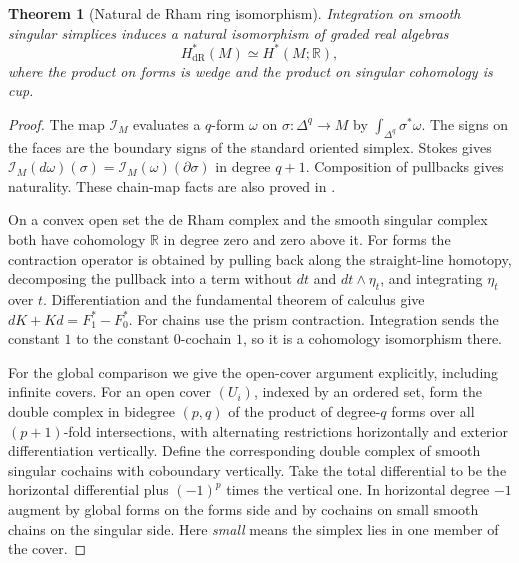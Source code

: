 \documentclass[11pt,oneside,openany]{book}
\theoremstyle{plain}
\newtheorem{theorem}{Theorem}[chapter]
\theoremstyle{definition}
\theoremstyle{remark}
\begin{document}
\begin{theorem}[Natural de Rham ring isomorphism]
\label{thm:p202-de-rham}
Integration on smooth singular simplices induces a natural
isomorphism of graded real algebras
\[
 H_{\mathrm{dR}}^*(M)\simeq H^*(M;\mathbb R),
\]
where the product on forms is wedge and the product on
singular cohomology is cup.
\end{theorem}
\begin{proof}
The map \(\mathcal I_M\) evaluates a \(q\)-form \(\omega\)
on \(\sigma:\Delta^q\to M\) by \(\int_{\Delta^q}\sigma^*\omega\).
The signs on the faces are the boundary signs of the
standard oriented simplex. Stokes gives
\(\mathcal I_M(d\omega)(\sigma)=
\mathcal I_M(\omega)(\partial\sigma)\) in degree \(q+1\).
Composition of pullbacks gives naturality. These
chain-map facts are also proved in \cite[Chapter 12]{P104}.

On a convex open set the de Rham complex and the
smooth singular complex both have cohomology \(\mathbb R\)
in degree zero and zero above it. For forms the contraction
operator is obtained by pulling back along the straight-line
homotopy, decomposing the pullback into a term without
\(dt\) and \(dt\wedge\eta_t\), and integrating \(\eta_t\)
over \(t\). Differentiation and the fundamental theorem
of calculus give \(dK+Kd=F_1^*-F_0^*\).
For chains use the prism contraction. Integration sends
the constant \(1\) to the constant \(0\)-cochain \(1\),
so it is a cohomology isomorphism there.

For the global comparison we give the open-cover argument
explicitly, including infinite covers. For an open cover
\((U_i)\), indexed by an ordered set, form the double
complex in bidegree \((p,q)\) of the product of degree-\(q\)
forms over all \((p+1)\)-fold intersections, with alternating
restrictions horizontally and exterior differentiation
vertically. Define the corresponding double complex of
smooth singular cochains with coboundary vertically.
Take the total differential to be the horizontal
differential plus \((-1)^p\) times the vertical one. In
horizontal degree \(-1\) augment by global forms on the
forms side and by cochains on small smooth chains on the
singular side. Here \emph{small} means the simplex lies in
one member of the cover.


\end{proof}
\end{document}

